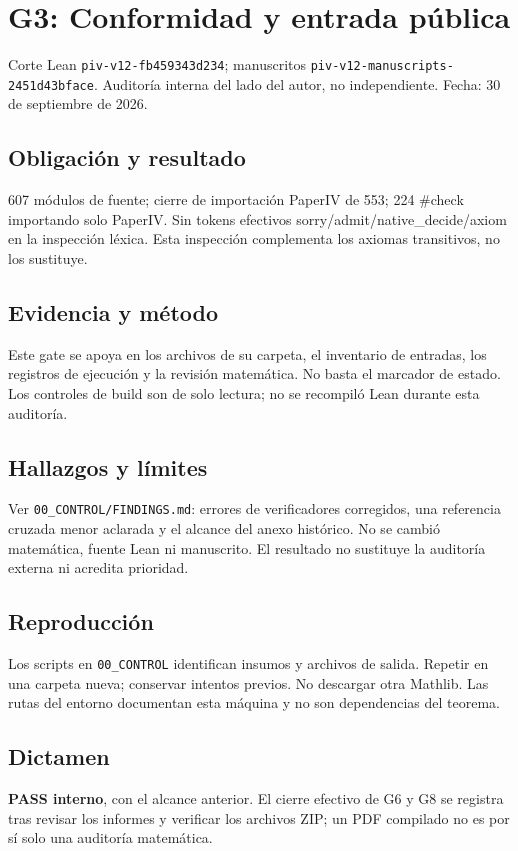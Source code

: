 \documentclass[11pt]{article}
\begin{document}
\section{G3: Conformidad y entrada
pública}\label{g3-conformidad-y-entrada-puxfablica}

Corte Lean \nolinkurl{piv-v12-fb459343d234}; manuscritos
\nolinkurl{piv-v12-manuscripts-2451d43bface}. Auditoría interna del lado
del autor, no independiente. Fecha: 30 de septiembre de 2026.

\subsection{Obligación y resultado}\label{obligaciuxf3n-y-resultado}

607 módulos de fuente; cierre de importación PaperIV de 553; 224 \#check
importando solo PaperIV. Sin tokens efectivos
sorry/admit/native\_decide/axiom en la inspección léxica. Esta
inspección complementa los axiomas transitivos, no los sustituye.

\subsection{Evidencia y método}\label{evidencia-y-muxe9todo}

Este gate se apoya en los archivos de su carpeta, el inventario de
entradas, los registros de ejecución y la revisión matemática. No basta
el marcador de estado. Los controles de build son de solo lectura; no se
recompiló Lean durante esta auditoría.

\subsection{Hallazgos y límites}\label{hallazgos-y-luxedmites}

Ver \nolinkurl{00_CONTROL/FINDINGS.md}: errores de verificadores
corregidos, una referencia cruzada menor aclarada y el alcance del anexo
histórico. No se cambió matemática, fuente Lean ni manuscrito. El
resultado no sustituye la auditoría externa ni acredita prioridad.

\subsection{Reproducción}\label{reproducciuxf3n}

Los scripts en \nolinkurl{00_CONTROL} identifican insumos y archivos de
salida. Repetir en una carpeta nueva; conservar intentos previos. No
descargar otra Mathlib. Las rutas del entorno documentan esta máquina y
no son dependencias del teorema.

\subsection{Dictamen}\label{dictamen}

\textbf{PASS interno}, con el alcance anterior. El cierre efectivo de G6
y G8 se registra tras revisar los informes y verificar los archivos ZIP;
un PDF compilado no es por sí solo una auditoría matemática.
\end{document}
